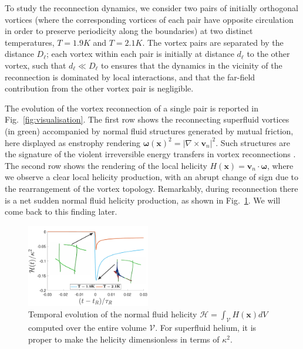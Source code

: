 \documentclass[%
 reprint,
 amsmath,amssymb,
 aps,
 prl,
]{revtex4-2}
\newcommand{\bom}{\boldsymbol{\omega}}
\def \v{\mathbf{v}}
\def \x{\mathbf{x}}
\begin{document}
{To study the reconnection dynamics, we consider two pairs of initially orthogonal vortices (where the corresponding vortices of each pair have opposite circulation in order to preserve periodicity along the boundaries)
at two distinct temperatures, $T=1.9K$ and $T=2.1K$. The vortex pairs are separated by the distance $D_{\ell}$; each vortex within each pair is initially at distance $d_{\ell}$ to the other vortex, such that $d_{\ell}\ll D_{\ell}$ to ensures that the dynamics in the vicinity of the reconnection is dominated by local interactions, and that the far-field contribution from the other vortex pair is negligible.

The evolution of the vortex reconnection of a single pair is reported in Fig.~\ref{fig:visualisation}. 
The first row shows the reconnecting superfluid vortices (in green) accompanied by normal fluid structures generated by mutual friction, here displayed as enstrophy rendering $\bom(\x)^2=|\nabla\times \v_n|^2$. Such structures are the signature of the violent irreversible energy transfers in vortex reconnections 
\cite{stasiak2024quantum}. The second row shows the rendering of the local helicity $H(\x)=\v_n\cdot\bom$, where we observe a clear local helicity production, with an abrupt change of sign due to the rearrangement of the vortex topology. Remarkably, during reconnection there is a net 
sudden normal fluid helicity production, as shown in Fig.~\ref{fig:total-helicity}. We will come back to this finding later.
\begin{figure}[t]
    \centering
    \includegraphics*[width=0.48\textwidth]{helicity_normal_fluid.pdf}
\caption{Temporal evolution of the normal fluid helicity $\mathcal{H} = \int_{\mathcal{V}}H(\x)dV$ computed over the entire volume $\mathcal{V}$. For superfluid helium, it is proper to make the helicity dimensionless in terms of $\kappa^2$.}
\label{fig:total-helicity}
\end{figure}

}
\end{document}
